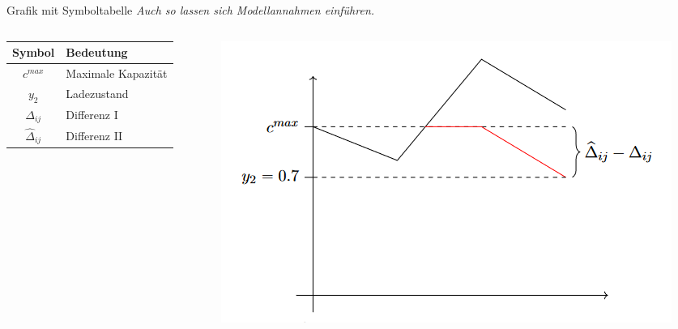 \begin{frame}{Grafik mit Symboltabelle}
    \textit{Auch so lassen sich Modellannahmen einführen.}
    \begin{columns}
        \begin{column}{0.4\textwidth}
        \centering
            \begin{tabular}{cl} 
            \toprule
            Symbol & Bedeutung\\ 
            \midrule
            $c^{max}$ & Maximale Kapazität \\
            $y_2$ & Ladezustand \\
            $\Delta_{ij}$ & Differenz I\\
            $\hat{\Delta}_{ij}$ & Differenz II\\ 
            \bottomrule
        \end{tabular}
        \end{column}
        
        \begin{column}{0.6\textwidth}
            \includegraphics[width=\textwidth]{Abbildungen/Beispielgrafik.PNG}
        \end{column}
    \end{columns}
\end{frame}


